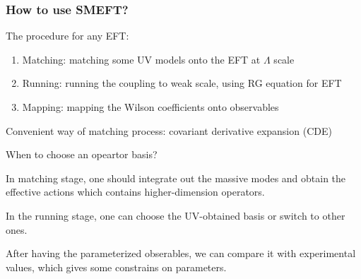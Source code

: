 \documentclass[8pt]{beamer}
\begin{document}
\begin{frame}
   \frametitle{How to use SMEFT?}
   The procedure for any EFT:
   \begin{enumerate}
     \item Matching: matching some UV models onto the EFT at $\Lambda$ scale
     \item Running: running the coupling to weak scale, using RG equation for EFT
     \item Mapping: mapping the Wilson coefficients onto observables
   \end{enumerate}
   Convenient way of matching process: covariant derivative expansion (CDE)

   When to choose an opeartor basis?

   In matching stage, one should integrate out the massive modes and obtain the effective actions which contains higher-dimension operators.

   In the running stage, one can choose the UV-obtained basis or switch to other ones.

   After having the parameterized obserables, we can compare it with experimental values, which gives some constrains on parameters.
\end{frame}
\end{document}
